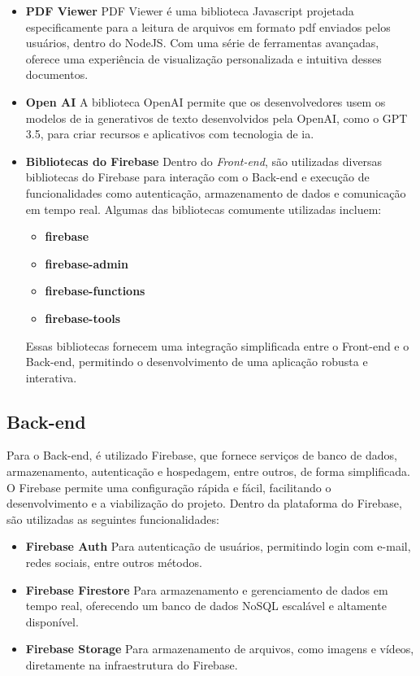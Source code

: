 \begin{itemize}
    \item \textbf{PDF Viewer} \newline
PDF Viewer é uma biblioteca Javascript projetada especificamente para a leitura de arquivos em formato \acs{pdf} enviados pelos usuários, dentro do NodeJS. Com uma série de ferramentas avançadas, oferece uma experiência de visualização personalizada e intuitiva desses documentos.

    \item \textbf{Open AI} \newline
A biblioteca OpenAI permite que os desenvolvedores usem os modelos de \acs{ia} generativos de texto desenvolvidos pela OpenAI, como o GPT 3.5, para criar recursos e aplicativos com tecnologia de \acs{ia}.

    \item \textbf{Bibliotecas do Firebase} \newline
Dentro do \textit{Front-end}, são utilizadas diversas bibliotecas do Firebase para interação com o Back-end e execução de funcionalidades como autenticação, armazenamento de dados e comunicação em tempo real. Algumas das bibliotecas comumente utilizadas incluem:
\begin{itemize}
    \item \textbf{firebase}
    \item \textbf{firebase-admin}
    \item \textbf{firebase-functions}
    \item \textbf{firebase-tools}
\end{itemize}

Essas bibliotecas fornecem uma integração simplificada entre o Front-end e o Back-end, permitindo o desenvolvimento de uma aplicação robusta e interativa.

\end{itemize}

\subsection{Back-end}
Para o Back-end, é utilizado Firebase, que fornece serviços de banco de dados, armazenamento, autenticação e hospedagem, entre outros, de forma simplificada. O Firebase permite uma configuração rápida e fácil, facilitando o desenvolvimento e a viabilização do projeto.
Dentro da plataforma do Firebase, são utilizadas as seguintes funcionalidades:

\begin{itemize}
\item \textbf{Firebase Auth} \newline
Para autenticação de usuários, permitindo login com e-mail, redes sociais, entre outros métodos.
\item \textbf{Firebase Firestore} \newline
Para armazenamento e gerenciamento de dados em tempo real, oferecendo um banco de dados NoSQL escalável e altamente disponível.
\item \textbf{Firebase Storage} \newline
Para armazenamento de arquivos, como imagens e vídeos, diretamente na infraestrutura do Firebase.
\end{itemize}


